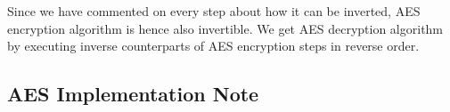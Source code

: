 \begin{note}
	Since we have commented on every step about how it can be inverted, AES encryption algorithm is hence also invertible. We get AES decryption algorithm by executing inverse counterparts of AES encryption steps in reverse order.
\end{note}



\subsection{AES Implementation Note}
\label{sec:aeslookup}

